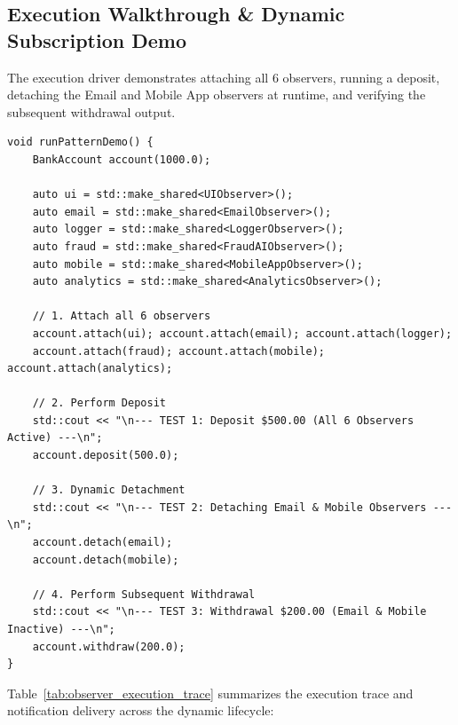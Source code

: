 \documentclass[12pt,a4paper]{article}
\begin{document}
\newpage
\subsection{Execution Walkthrough \& Dynamic Subscription Demo}

The execution driver demonstrates attaching all 6 observers, running a deposit, detaching the Email and Mobile App observers at runtime, and verifying the subsequent withdrawal output.

\begin{lstlisting}[caption=Observer Pattern Execution Demo (\texttt{runPatternDemo})]
void runPatternDemo() {
    BankAccount account(1000.0);

    auto ui = std::make_shared<UIObserver>();
    auto email = std::make_shared<EmailObserver>();
    auto logger = std::make_shared<LoggerObserver>();
    auto fraud = std::make_shared<FraudAIObserver>();
    auto mobile = std::make_shared<MobileAppObserver>();
    auto analytics = std::make_shared<AnalyticsObserver>();

    // 1. Attach all 6 observers
    account.attach(ui); account.attach(email); account.attach(logger);
    account.attach(fraud); account.attach(mobile); account.attach(analytics);

    // 2. Perform Deposit
    std::cout << "\n--- TEST 1: Deposit $500.00 (All 6 Observers Active) ---\n";
    account.deposit(500.0);

    // 3. Dynamic Detachment
    std::cout << "\n--- TEST 2: Detaching Email & Mobile Observers ---\n";
    account.detach(email);
    account.detach(mobile);

    // 4. Perform Subsequent Withdrawal
    std::cout << "\n--- TEST 3: Withdrawal $200.00 (Email & Mobile Inactive) ---\n";
    account.withdraw(200.0);
}
\end{lstlisting}

Table~\ref{tab:observer_execution_trace} summarizes the execution trace and notification delivery across the dynamic lifecycle:
\end{document}
